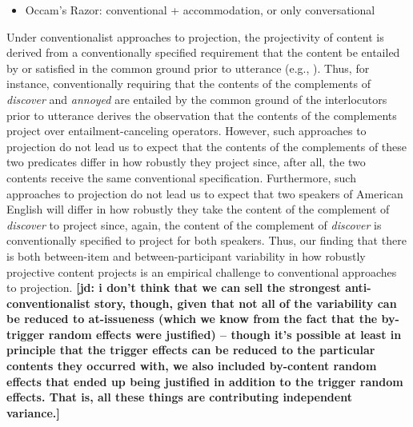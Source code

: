 \documentclass[11pt,fleqn]{article}
\newcommand{\6}{\mbox{$[\hspace*{-.6mm}[$}}
\newcommand{\9}{\mbox{$]\hspace*{-.6mm}]$}}
\newcommand{\jd}[1]{\textbf{\color{Green}[jd: #1]}}
\begin{document}
\begin{itemize}
\begin{itemize}
\item Occam's Razor: conventional + accommodation, or only conversational


\end{itemize}

Under conventionalist approaches to projection, the projectivity of content is derived from a conventionally specified requirement that the content be entailed by or satisfied in the common ground prior to utterance (e.g., \citealt{heim83,vds92}). Thus, for instance, conventionally requiring that the contents of the complements of {\em discover} and {\em annoyed} are entailed by the common ground of the interlocutors prior to utterance derives the observation that the contents of the complements project over entailment-canceling operators. However, such approaches to projection do not lead us to expect that the contents of the complements of these two predicates differ in how robustly they project since, after all, the two contents receive the same conventional specification. Furthermore, such approaches to projection do not lead us to expect that two speakers of American English will differ in how robustly they take the content of the complement of {\em discover} to project since, again, the content of the complement of {\em discover} is conventionally specified to project for both speakers. Thus, our finding that there is both between-item and between-participant variability in how robustly projective content projects is an empirical challenge to conventional approaches to projection. \jd{i don't think that we can sell the strongest anti-conventionalist story, though, given that not all of the variability can be reduced to at-issueness (which we know from the fact that the by-trigger random effects were justified) -- though it's possible at least in principle that the trigger effects can be reduced to the particular contents they occurred with, we also included by-content random effects that ended up being justified in addition to the trigger random effects. That is, all these things are contributing independent variance.}


\end{itemize}
\end{document}
